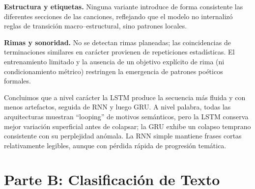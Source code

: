 \documentclass[paper=letter, fontsize=11pt, draft=false]{scrartcl}
\numberwithin{equation}{section} %
\numberwithin{figure}{section} %
\numberwithin{table}{section} %
\numberwithin{subsection}{section}
\begin{document}
\textbf{Estructura y etiquetas.} Ninguna variante introduce de forma consistente las diferentes secciones de las canciones, reflejando que el modelo no internalizó reglas de transición macro–estructural, sino patrones locales.

\textbf{Rimas y sonoridad.} No se detectan rimas planeadas; las coincidencias de terminaciones similares en carácter provienen de repeticiones estadísticas. El entrenamiento limitado y la ausencia de un objetivo explícito de rima (ni condicionamiento métrico) restringen la emergencia de patrones poéticos formales.

Concluimos que a nivel carácter la LSTM produce la secuencia más fluida y con menos artefactos, seguida de RNN y luego GRU. A nivel palabra, todas las arquitecturas muestran \/``looping'' de motivos semánticos, pero la LSTM conserva mejor variación superficial antes de colapsar; la GRU exhibe un colapso temprano consistente con su perplejidad anómala. La RNN simple mantiene frases cortas relativamente legibles, aunque con pérdida rápida de progresión temática.



\newpage
\section{Parte B: Clasificación de Texto}




\newpage
\end{document}
